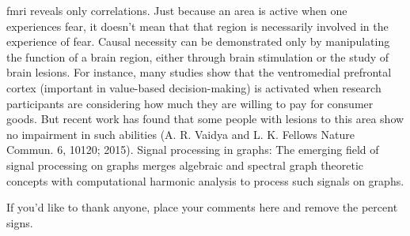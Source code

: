 \documentclass[onecollarge,runningheads]{svjour2}
\begin{document}
fmri reveals only correlations. Just because an area is active when one experiences fear, it doesn't mean that that region is necessarily involved in the experience of fear. Causal necessity can be demonstrated only by manipulating the function of a brain region, either through brain stimulation or the study of brain lesions. For instance, many studies show that the ventromedial prefrontal cortex (important in value-based decision-making) is activated when research participants are considering how much they are willing to pay for consumer goods. But recent work has found that some people with lesions to this area show no impairment in such abilities (A. R. Vaidya and L. K. Fellows Nature Commun. 6, 10120; 2015).
Signal processing in graphs: The emerging field of signal processing on graphs merges algebraic and spectral graph theoretic concepts with computational harmonic analysis to process such signals on graphs. 
\cite{shuman2013emerging}

\begin{acknowledgements}
If you'd like to thank anyone, place your comments here
and remove the percent signs.
\end{acknowledgements}


\end{document}
